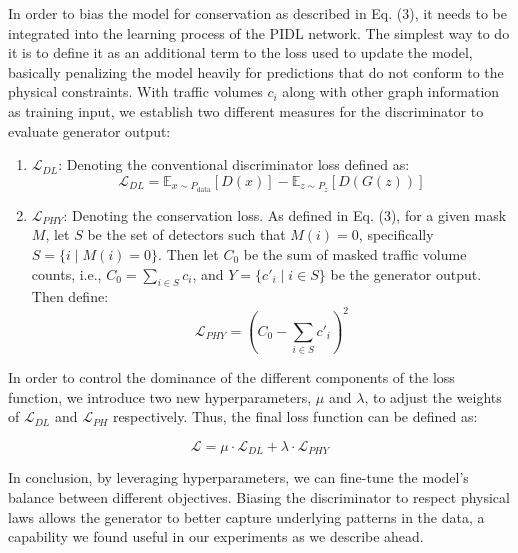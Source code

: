 In order to bias the model for conservation as described in Eq. (3), it needs to be integrated into the learning process of the PIDL network. The simplest way to do it is to define it as an additional term to the loss used to update the model, basically penalizing the model heavily for predictions that do not conform to the physical constraints. With traffic volumes \(c_i\) along with other graph information as training input, we establish two different measures for the discriminator to evaluate generator output:
\begin{enumerate}
    \item \textbf{\( \mathcal{L}_{DL} \)}: Denoting the conventional discriminator loss defined as:
    \[ \mathcal{L}_{DL} = \mathbb{E}_{x \sim P_{\text{data}}}[D(x)] - \mathbb{E}_{z \sim P_z}[D(G(z))] \]

    \item \textbf{\( \mathcal{L}_{PHY} \)}: Denoting the conservation loss. As defined in Eq. (3), for a given mask \( M \), let \( S \) be the set of detectors such that \( M(i) = 0 \), specifically \( S = \{i \mid M(i) = 0\} \). Then let \( C_0 \) be the sum of masked traffic volume counts, i.e., \( C_0 = \sum_{i \in S} c_i \), and \( Y = \{c'_i \mid i \in S\} \) be the generator output. Then define:
    \[ \mathcal{L}_{PHY} = (C_0 - \sum_{i \in S} c'_i)^2 \]
\end{enumerate}
In order to control the dominance of the different components of the loss function, we introduce two new hyperparameters, \( \mu \) and \( \lambda \), to adjust the weights of \( \mathcal{L}_{DL} \) and \( \mathcal{L}_{PH} \) respectively. Thus, the final loss function can be defined as:

\[ \mathcal{L} = \mu \cdot \mathcal{L}_{DL} + \lambda \cdot \mathcal{L}_{PHY} \]

In conclusion, by leveraging hyperparameters, we can fine-tune the model's balance between different objectives. Biasing the discriminator to respect physical laws allows the generator to better capture underlying patterns in the data, a capability we found useful in our experiments as we describe ahead.
